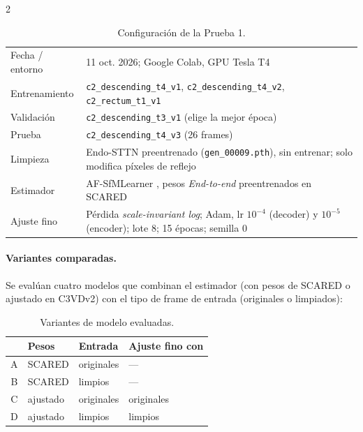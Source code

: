 \documentclass[11pt,letterpaper]{article}
\begin{document}
\begin{multicols}{2}
\begin{table}[H]
\centering
\scriptsize
\caption{Configuración de la Prueba 1.}
\label{tab:config}
\begin{tabular}{@{}p{1.9cm}p{5.3cm}@{}}
\toprule
Fecha / entorno & 11 oct. 2026; Google Colab, GPU Tesla T4 \\
Entrenamiento & \texttt{c2\_\allowbreak descending\_\allowbreak t4\_\allowbreak v1}, \texttt{c2\_\allowbreak descending\_\allowbreak t4\_\allowbreak v2}, \texttt{c2\_\allowbreak rectum\_\allowbreak t1\_\allowbreak v1} \\
Validación & \texttt{c2\_\allowbreak descending\_\allowbreak t3\_\allowbreak v1} (elige la mejor época) \\
Prueba & \texttt{c2\_\allowbreak descending\_\allowbreak t4\_\allowbreak v3} (26 frames) \\
Limpieza & Endo-STTN preentrenado (\texttt{gen\_\allowbreak 00009.pth}), sin entrenar; solo modifica píxeles de reflejo \\
Estimador & AF-SfMLearner \cite{Shao2022}, pesos \textit{End-to-end} preentrenados en SCARED \cite{Allan2021} \\
Ajuste fino & Pérdida \textit{scale-invariant log}; Adam, lr $10^{-4}$ (decoder) y $10^{-5}$ (encoder); lote 8; 15 épocas; semilla 0 \\
\bottomrule
\end{tabular}
\end{table}

\paragraph{Variantes comparadas.} Se evalúan cuatro modelos que combinan el estimador (con pesos de SCARED o ajustado en C3VDv2) con el tipo de frame de entrada (originales o limpiados):

\begin{table}[H]
\centering
\scriptsize
\caption{Variantes de modelo evaluadas.}
\label{tab:variantes}
\begin{tabular}{@{}clll@{}}
\toprule
 & Pesos & Entrada & Ajuste fino con \\
\midrule
A & SCARED & originales & --- \\
B & SCARED & limpios & --- \\
C & ajustado & originales & originales \\
D & ajustado & limpios & limpios \\
\bottomrule
\end{tabular}
\end{table}




\end{multicols}
\end{document}

